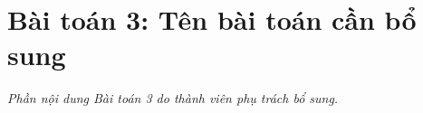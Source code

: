 \section{Bài toán 3: Tên bài toán cần bổ sung}
\label{sec:task3}
\textit{Phần nội dung Bài toán 3 do thành viên phụ trách bổ sung.}
